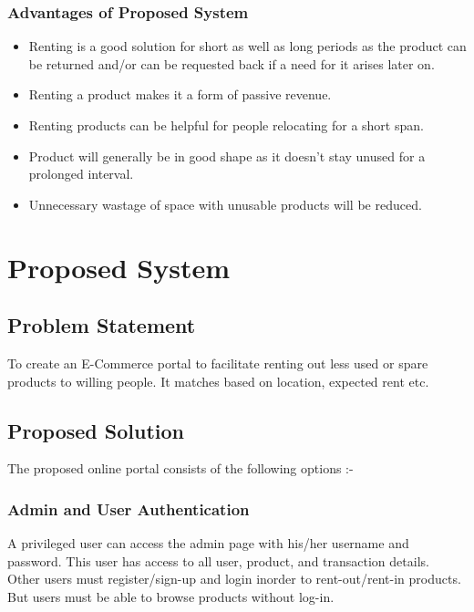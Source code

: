 \documentclass[11pt]{report}
\begin{document}
\subsection{Advantages of Proposed System}
\begin{itemize}
  \item Renting is a good solution for short as well as long periods as the product can be returned and/or can be requested back if a need for it arises later on.
  \item Renting a product makes it a form of passive revenue.
  \item Renting products can be helpful for people relocating for a short span.
  \item Product will generally be in good shape as it doesn't stay unused for a prolonged interval. 
  \item Unnecessary wastage of space with unusable products will be reduced.
\end{itemize}
 
 
\chapter {Proposed System}
\label{ps}

\section{Problem Statement}

To create an E-Commerce portal to facilitate renting out less used or spare products to willing people. It matches based on location, expected rent etc.

\section{Proposed Solution}

The proposed online portal consists of the following options :-
\subsection{Admin and User Authentication}
A privileged user can access the admin page with his/her username and password. This user has access to all user, product, and transaction details.
\\Other users must register/sign-up and login inorder to rent-out/rent-in products. But users must be able to browse products without log-in.
\end{document}
